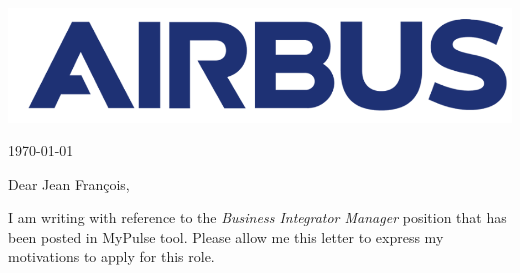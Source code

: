 \documentclass[11pt,a4paper]{letter}
\begin{document}
\thispagestyle{empty}

\vspace{15pt}

\begin{center}
\includegraphics[scale=0.1]{Images/airbus_blue_logo.png}
\end{center}
\vspace{30pt}

\hspace*{\fill} \longdate\today 


\vspace{15pt}



Dear Jean François,

\vspace{15pt}

I am writing with reference to the \textit{Business Integrator Manager} position that has been posted in MyPulse tool. Please allow me this letter to express my motivations to apply for this role.
\end{document}
